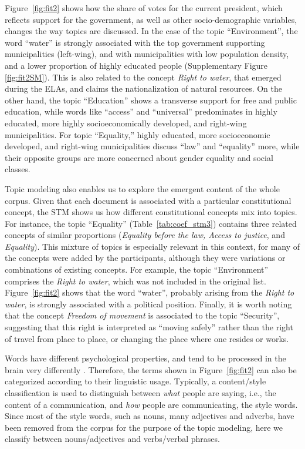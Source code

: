 \documentclass[onecolumn]{article}
\begin{document}
Figure~\ref{fig:fit2} shows how the share of votes for the current president, which reflects support for the government, as well as other socio-demographic variables, changes the way topics are discussed. In the case of the topic ``Environment'', the word ``water'' is strongly associated with the top government supporting municipalities (left-wing), and with municipalities with low population density, and a lower proportion of highly educated people (Supplementary Figure \ref{fig:fit2SM}). This is also related to the concept \textit{Right to water}, that emerged during the ELAs, and claims the nationalization of natural resources. On the other hand, the topic ``Education'' shows a transverse support for free and public education, while words like  ``access'' and ``universal'' predominates in highly educated, more highly socioeconomically developed, and right-wing municipalities. For topic ``Equality,'' highly educated, more socioeconomic developed, and right-wing municipalities discuss ``law'' and ``equality'' more, while their opposite groups are more concerned about gender equality and social classes. 


Topic modeling also enables us to explore the emergent content of the whole corpus. Given that each document is associated with a particular constitutional concept, the STM shows us how different constitutional concepts mix into topics. For instance, the topic ``Equality'' (Table~\ref{tab:coef_stm3}) contains three related concepts of similar proportions (\textit{Equality before the law, Access to justice}, and \textit{Equality}).%
This mixture of topics is especially relevant in this context, for many of the concepts were added by the participants, although they were variations or combinations of existing concepts.  For example, the topic ``Environment'' comprises the \textit{Right to water}, which was not included in the original list. Figure~\ref{fig:fit2} shows that the word ``water'', probably arising from the  \textit{Right to water},  is strongly associated with a political position. Finally, it is worth noting that the concept \textit{Freedom of movement} is associated to the topic ``Security'', suggesting that this right is interpreted as ``moving safely'' rather than the right of  travel from place to place, or changing the place where one resides or works.

Words have different psychological properties, and tend to be processed in the brain very differently \cite{miller1995, tausczik2010}. Therefore, the terms shown in Figure~\ref{fig:fit2} can also be categorized according to their linguistic usage. Typically, a content/style classification is used to distinguish between \textit{what} people are saying, i.e., the content of a communication, and \textit{how} people are communicating, the style words. Since most of the style words, such as nouns, many adjectives and adverbs, have been removed from the corpus for the purpose of the topic modeling, here we classify between nouns/adjectives and verbs/verbal phrases. 
\end{document}
